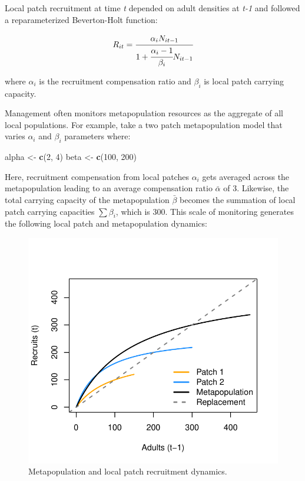 \documentclass[
]{article}
\newenvironment{Shaded}{\begin{snugshade}}{\end{snugshade}}
\newcommand{\DecValTok}[1]{\textcolor[rgb]{0.00,0.00,0.81}{#1}}
\newcommand{\KeywordTok}[1]{\textcolor[rgb]{0.13,0.29,0.53}{\textbf{#1}}}
\newcommand{\NormalTok}[1]{#1}
\newcommand{\StringTok}[1]{\textcolor[rgb]{0.31,0.60,0.02}{#1}}
\renewenvironment{Shaded}{\vspace{\parskip}\begin{snugshade}}{\end{snugshade}}
\begin{document}
Local patch recruitment at time \emph{t} depended on adult densities at
\emph{t-1} and followed a reparameterized Beverton-Holt function:

\begin{align}
R_{it}=\cfrac{\alpha_iN_{it-1}}{1+\cfrac{\alpha_i-1}{\beta_i}N_{it-1}}
\end{align}

where \(\alpha_i\) is the recruitment compensation ratio and \(\beta_i\)
is local patch carrying capacity.

Management often monitors metapopulation resources as the aggregate of
all local populations. For example, take a two patch metapopulation
model that varies \(\alpha_i\) and \(\beta_i\) parameters where:

\begin{Shaded}
\begin{Highlighting}[]
\NormalTok{alpha <-}\StringTok{ }\KeywordTok{c}\NormalTok{(}\DecValTok{2}\NormalTok{, }\DecValTok{4}\NormalTok{)}
\NormalTok{beta <-}\StringTok{ }\KeywordTok{c}\NormalTok{(}\DecValTok{100}\NormalTok{, }\DecValTok{200}\NormalTok{)}
\end{Highlighting}
\end{Shaded}

Here, recruitment compensation from local patches \(\alpha_i\) gets
averaged across the metapopulation leading to an average compensation
ratio \(\bar{\alpha}\) of 3. Likewise, the total carrying capacity of
the metapopulation \(\bar{\beta}\) becomes the summation of local patch
carrying capacities \(\sum\beta_i\), which is 300. This scale of
monitoring generates the following local patch and metapopulation
dynamics:

\begin{figure}[H]

{\centering \includegraphics{Managing_for_ecological_surprises_in_metapopulations_files/figure-latex/recruit curves-1} 

}

\caption{Metapopulation and local patch recruitment dynamics.}\label{fig:recruit curves}
\end{figure}
\end{document}
